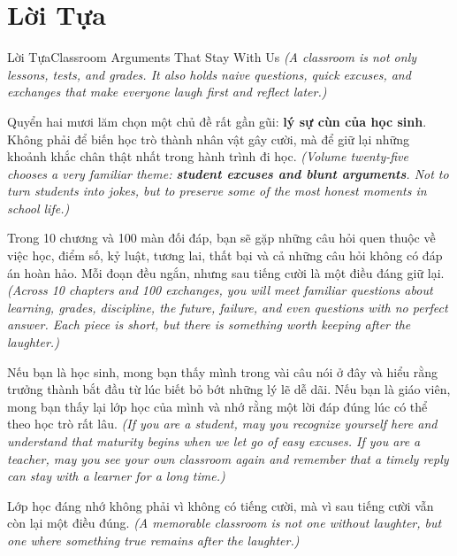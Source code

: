 \chapter*{Lời Tựa}

\begin{truyen}{Lời Tựa}{Classroom Arguments That Stay With Us}
\textit{(A classroom is not only lessons, tests, and grades. It also holds naive questions, quick excuses, and exchanges that make everyone laugh first and reflect later.)}

Quyển hai mươi lăm chọn một chủ đề rất gần gũi: \textbf{lý sự cùn của học sinh}. Không phải để biến học trò thành nhân vật gây cười, mà để giữ lại những khoảnh khắc chân thật nhất trong hành trình đi học.
\textit{(Volume twenty-five chooses a very familiar theme: \textbf{student excuses and blunt arguments}. Not to turn students into jokes, but to preserve some of the most honest moments in school life.)}

Trong 10 chương và 100 màn đối đáp, bạn sẽ gặp những câu hỏi quen thuộc về việc học, điểm số, kỷ luật, tương lai, thất bại và cả những câu hỏi không có đáp án hoàn hảo. Mỗi đoạn đều ngắn, nhưng sau tiếng cười là một điều đáng giữ lại.
\textit{(Across 10 chapters and 100 exchanges, you will meet familiar questions about learning, grades, discipline, the future, failure, and even questions with no perfect answer. Each piece is short, but there is something worth keeping after the laughter.)}

Nếu bạn là học sinh, mong bạn thấy mình trong vài câu nói ở đây và hiểu rằng trưởng thành bắt đầu từ lúc biết bỏ bớt những lý lẽ dễ dãi. Nếu bạn là giáo viên, mong bạn thấy lại lớp học của mình và nhớ rằng một lời đáp đúng lúc có thể theo học trò rất lâu.
\textit{(If you are a student, may you recognize yourself here and understand that maturity begins when we let go of easy excuses. If you are a teacher, may you see your own classroom again and remember that a timely reply can stay with a learner for a long time.)}
\end{truyen}

\begin{baihoc}
Lớp học đáng nhớ không phải vì không có tiếng cười, mà vì sau tiếng cười vẫn còn lại một điều đúng.
\textit{(A memorable classroom is not one without laughter, but one where something true remains after the laughter.)}
\end{baihoc}

